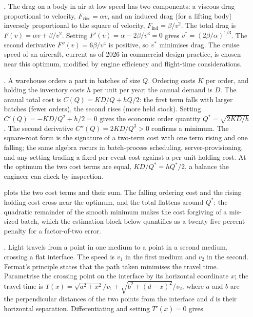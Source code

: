 . The drag
on a body in air at low speed has two components: a viscous drag
proportional to velocity, $F_{\text{visc}} = \alpha v$, and an
induced drag (for a lifting body) inversely proportional to the
square of velocity, $F_{\text{ind}} = \beta / v^{2}$. The total
drag is $F(v) = \alpha v + \beta / v^{2}$. Setting $F'(v) =
\alpha - 2 \beta / v^{3} = 0$ gives $v^{*} = (2 \beta /
\alpha)^{1/3}$. The second derivative $F''(v) = 6 \beta / v^{4}$
is positive, so $v^{*}$ minimises drag. The cruise speed of an
aircraft, current as of 2026 in commercial design practice, is
chosen near this optimum, modified by engine efficiency and
flight-time considerations.

. A warehouse orders a part in
batches of size $Q$. Ordering costs $K$ per order, and holding the
inventory costs $h$ per unit per year; the annual demand is $D$.
The annual total cost is $C(Q) = K D / Q + h Q / 2$: the first term
falls with larger batches (fewer orders), the second rises (more
held stock). Setting $C'(Q) = -K D / Q^{2} + h/2 = 0$ gives the
economic order quantity $Q^{*} = \sqrt{2 K D / h}$. The second
derivative $C''(Q) = 2 K D / Q^{3} > 0$ confirms a minimum. The
square-root form is the signature of a two-term cost with one term
rising and one falling; the same algebra recurs in batch-process
scheduling, server-provisioning, and any setting trading a fixed
per-event cost against a per-unit holding cost. At the optimum the
two cost terms are equal, $K D / Q^{*} = h Q^{*}/2$, a balance the
engineer can check by inspection.



 plots the two cost terms and their
sum. The falling ordering cost and the rising holding cost cross
near the optimum, and the total flattens around $Q^{*}$: the
quadratic remainder of the smooth minimum makes the cost forgiving
of a mis-sized batch, which the estimation block below quantifies as
a twenty-five percent penalty for a factor-of-two error.

. Light travels from a point
in one medium to a point in a second medium, crossing a flat
interface. The speed is $v_{1}$ in the first medium and $v_{2}$ in
the second. Fermat's principle states that the path taken minimises
the travel time. Parametrise the crossing point on the interface by
its horizontal coordinate $x$; the travel time is $T(x) =
\sqrt{a^{2} + x^{2}}/v_{1} + \sqrt{b^{2} + (d - x)^{2}}/v_{2}$,
where $a$ and $b$ are the perpendicular distances of the two points
from the interface and $d$ is their horizontal separation.
Differentiating and setting $T'(x) = 0$ gives

